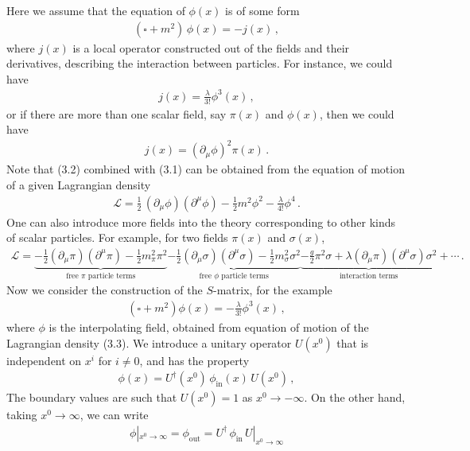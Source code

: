 \documentclass[11pt, onesided]{book}
\theoremstyle{break}
\theoremstyle{break}
\newcommand{\pd}{\partial}
\begin{document}
Here we assume that the equation of $\phi(x)$ is of some form 
\begin{align}
(\square + m^2)\, \phi(x) = -j(x)\,,
\end{align}
where $j(x)$ is a local operator constructed out of the fields and their derivatives, describing the interaction between particles. For instance, we could have
\begin{align}
j(x) = \frac{\lambda}{3!}\phi^3(x)\,,
\end{align}
or if there are more than one scalar field, say $\pi(x)$ and $\phi(x)$, then we could have 
\begin{align*}
j(x) = (\pd_\mu \phi)^2 \pi(x)\,.
\end{align*}
Note that (3.2) combined with (3.1) can be obtained from the equation of motion of a given Lagrangian density
\begin{align}
\mathcal{L} = \frac{1}{2}\,(\pd_\mu \phi)(\pd^\mu \phi) - \frac{1}{2}m^2 \phi^2 - \frac{\lambda}{4!} \phi^4\,.
\end{align}
One can also introduce more fields into the theory corresponding to other kinds of scalar particles. For example, for two fields $\pi(x)$ and $\sigma(x)$, 
\begin{align*}
\mathcal{L} = \underbrace{-\frac{1}{2}(\pd_\mu \pi)(\pd^\mu \pi) - \frac{1}{2}m_\pi^2 \pi^2 }_{\text{free $\pi$ particle terms}}\underbrace{- \frac{1}{2}(\pd_\mu \sigma)(\pd^\mu \sigma) - \frac{1}{2}m_\sigma^2 \sigma^2}_{\text{free $\phi$ particle terms}} \underbrace{ -\frac{g}{2} \pi^2\sigma +\lambda (\pd_\mu \pi)(\pd^\mu \sigma) \sigma^2}_{\text{interaction terms}} +\cdots\,.
\end{align*}
Now we consider the construction of the $S$-matrix, for the example
\begin{align*}
(\square + m^2) \phi(x) = -\frac{\lambda}{3!}\phi^3(x)\,,
\end{align*}
where $\phi$ is the interpolating field, obtained from equation of motion of the Lagrangian density (3.3). We introduce a unitary operator $U(x^0)$ that is independent on $x^i$ for $i \neq 0$, and has the property
\begin{align*}
\phi(x) = U^\dagger(x^0)\, \phi_{\text{in}}(x) \, U(x^0)\,, 
\end{align*}
The boundary values are such that $U(x^0) = 1$ as $x^0 \to -\infty$. On the other hand, taking $x^0 \to \infty$, we can write
\begin{align*}
\phi|_{x^0\to \infty} = \phi_{\text{out}} = U^\dagger\, \phi_{\text{in}}\, U|_{x^0 \to \infty}
\end{align*}
\end{document}
